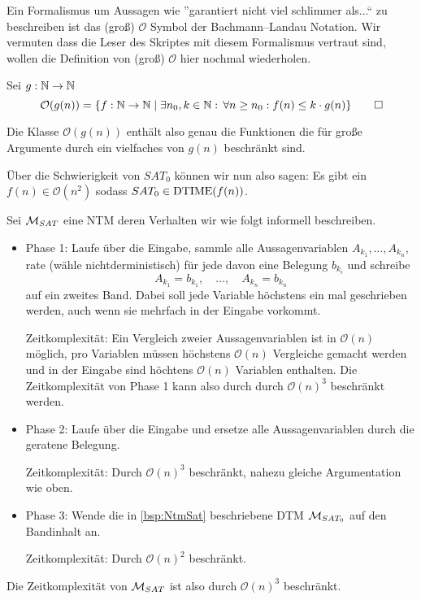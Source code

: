 Ein Formalismus um Aussagen wie ''garantiert nicht viel schlimmer als...``
zu beschreiben ist das (groß) $\mathcal{O}$ Symbol der Bachmann–Landau Notation.
Wir vermuten dass die Leser des Skriptes mit diesem Formalismus vertraut sind, wollen die Definition von (groß) $\mathcal{O}$ hier nochmal wiederholen.

\begin{Def} Sei $g:\mathbb{N}\rightarrow\mathbb{N}$
\[ \mathcal{O}(g(n)) = \{f:\mathbb{N}\rightarrow\mathbb{N} \mid \exists n_0, k\in\mathbb{N}:\, \forall n\geq n_0: f(n)\leq k\cdot g(n)\} \qedhere \]
\end{Def}
Die Klasse $\mathcal{O}(g(n))$ enthält also genau die Funktionen die für große Argumente durch ein vielfaches von $g(n)$ beschränkt sind.

Über die Schwierigkeit von $SAT_0$ können wir nun also sagen:
Es gibt ein $f(n)\in\mathcal{O}(n^2)$ sodass $SAT_0\in\operatorname{DTIME}(f(n))$.

\begin{Bsp}\label{bsp:NtmSat}
Sei $\mathcal{M}_{SAT}$ eine NTM deren Verhalten wir wie folgt informell beschreiben.
\begin{itemize}
 \item Phase 1: Laufe über die Eingabe, sammle alle Aussagenvariablen $A_{k_1},\ldots,A_{k_n}$, rate (wähle nichtderministisch) für jede davon eine Belegung $b_{k_i}$ und schreibe 
 $$A_{k_1}=b_{k_1},\quad\ldots,\quad A_{k_n}=b_{k_n}$$
 auf ein zweites Band.
 Dabei soll jede Variable höchstens ein mal geschrieben werden, auch wenn sie mehrfach in der Eingabe vorkommt.
  
 Zeitkomplexität: 
 Ein Vergleich zweier Aussagenvariablen ist in $\mathcal{O}(n)$ möglich,
 pro Variablen müssen höchstens $\mathcal{O}(n)$ Vergleiche gemacht werden und
 in der Eingabe sind höchtens $\mathcal{O}(n)$ Variablen enthalten.
 Die Zeitkomplexität von Phase 1 kann also durch durch $\mathcal{O}(n)^3$ beschränkt werden.
 
 \item Phase 2: Laufe über die Eingabe und ersetze alle Aussagenvariablen durch die geratene Belegung.
 
 Zeitkomplexität: Durch $\mathcal{O}(n)^3$ beschränkt, nahezu gleiche Argumentation wie oben.
 
 \item Phase 3: Wende die in \autoref{bsp:NtmSat} beschriebene DTM $\mathcal{M}_{SAT_0}$ auf den Bandinhalt an.
 
 Zeitkomplexität: Durch $\mathcal{O}(n)^2$ beschränkt.
\end{itemize}
Die Zeitkomplexität von $\mathcal{M}_{SAT}$ ist also durch $\mathcal{O}(n)^3$ beschränkt.
\end{Bsp}

